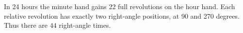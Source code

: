 In 24 hours the minute hand gains 22 full revolutions on the hour hand. Each relative revolution has exactly two right-angle positions, at 90 and 270 degrees. Thus there are $\boxed{44}$ right-angle times.
